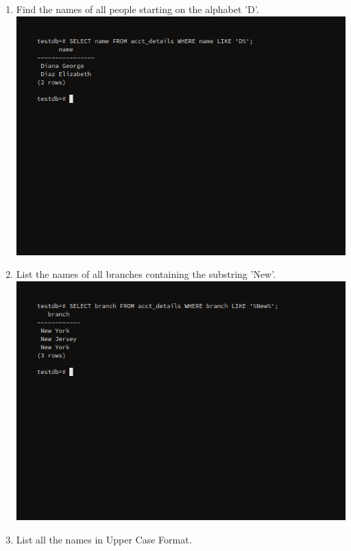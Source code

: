 \documentclass[10pt,a4paper,titlepage]{report}
\begin{document}
{\begin{enumerate}
	\item Find the names of all people starting on the alphabet 'D'.\newline
	\includegraphics[width=\linewidth]{../Images/Strings/2.png}
	\item List the names of all branches containing the substring 'New'.\newline
	\includegraphics[width=\linewidth]{../Images/Strings/3.png}
	\item List all the names in Upper Case Format.\newline

\end{enumerate}}
\end{document}

